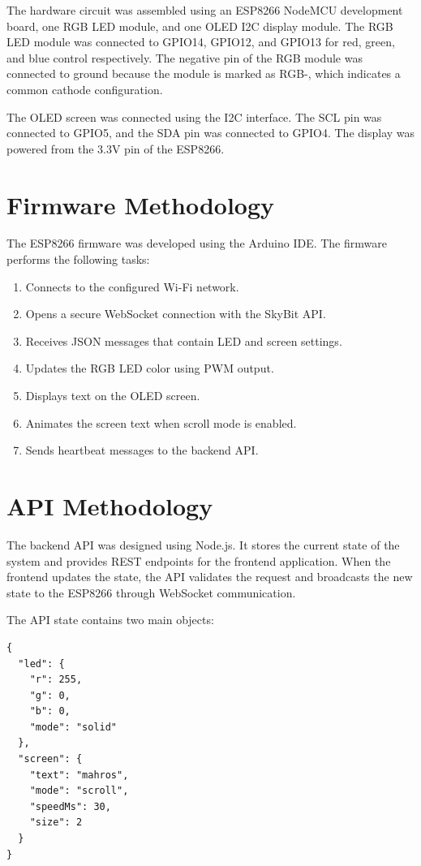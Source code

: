 \documentclass[12pt,a4paper]{report}
\begin{document}
The hardware circuit was assembled using an ESP8266 NodeMCU development board, one RGB LED module, and one OLED I2C display module. The RGB LED module was connected to GPIO14, GPIO12, and GPIO13 for red, green, and blue control respectively. The negative pin of the RGB module was connected to ground because the module is marked as RGB-, which indicates a common cathode configuration.

The OLED screen was connected using the I2C interface. The SCL pin was connected to GPIO5, and the SDA pin was connected to GPIO4. The display was powered from the 3.3V pin of the ESP8266.

\section{Firmware Methodology}

The ESP8266 firmware was developed using the Arduino IDE. The firmware performs the following tasks:

\begin{enumerate}
    \item Connects to the configured Wi-Fi network.
    \item Opens a secure WebSocket connection with the SkyBit API.
    \item Receives JSON messages that contain LED and screen settings.
    \item Updates the RGB LED color using PWM output.
    \item Displays text on the OLED screen.
    \item Animates the screen text when scroll mode is enabled.
    \item Sends heartbeat messages to the backend API.
\end{enumerate}

\section{API Methodology}

The backend API was designed using Node.js. It stores the current state of the system and provides REST endpoints for the frontend application. When the frontend updates the state, the API validates the request and broadcasts the new state to the ESP8266 through WebSocket communication.

The API state contains two main objects:

\begin{verbatim}
{
  "led": {
    "r": 255,
    "g": 0,
    "b": 0,
    "mode": "solid"
  },
  "screen": {
    "text": "mahros",
    "mode": "scroll",
    "speedMs": 30,
    "size": 2
  }
}
\end{verbatim}
\end{document}
